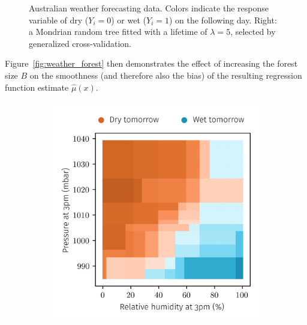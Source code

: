 \begin{figure}[ht]
\begin{subfigure}{0.49\textwidth}
  \end{subfigure}
  \caption{Australian weather forecasting data. Colors indicate the response
    variable of dry ($Y_i = 0$) or wet ($Y_i = 1$) on the following day.
    Right: a Mondrian random tree fitted with a lifetime of $\lambda = 5$,
  selected by generalized cross-validation.}
  \label{fig:weather_data}
\end{figure}

Figure~\ref{fig:weather_forest} then
demonstrates the effect of increasing the forest size $B$ on the smoothness
(and therefore also the bias) of the resulting regression function estimate
$\hat \mu(x)$.

\begin{figure}[ht]
  \centering
  \begin{subfigure}{0.49\textwidth}
    \centering
    \includegraphics[scale=0.8]{graphics/weather_forest_2.png}%
  \end{subfigure}
  \begin{subfigure}{0.49\textwidth}
    \centering

\end{subfigure}
\end{figure}
